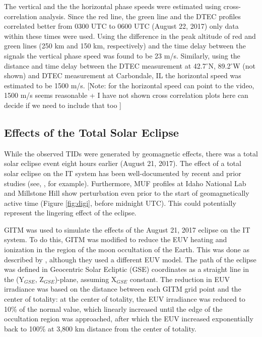  The vertical and the the horizontal phase speeds were estimated using cross-correlation analysis. Since the red line, the green line and the DTEC profiles correlated  better from 0300 UTC to 0600 UTC (August 22, 2017) only data within these times were used. Using the difference in the peak altitude of red and green lines (250 km and 150 km, respectively) and the time delay between the signals the vertical phase speed was found to be 23 m/s. Similarly, using the distance and time delay between the DTEC measurement at 42.7$^\circ$N, 89.2$^\circ$W (not shown) and DTEC measurement at Carbondale, IL the horizontal speed was estimated to be 1500 m/s. [Note: for the horizontal speed can point to the video, 1500 m/s seems reasonable + I have not shown cross correlation plots here can decide if we need to include that too ]
 \subsection{Effects of the Total Solar Eclipse}
While the observed TIDs were generated by geomagnetic effects, there was a total solar eclipse event eight hours earlier (August 21, 2017). The effect of a total solar eclipse on the IT system has been well-documented by recent and prior studies (see, \citet{coster_gnss_2017,mrak_eclipse_2018,liu_1998}, for example). Furthermore, MUF profiles at Idaho National Lab and Millstone Hill show perturbation even prior to the start of geomagnetically active time (Figure \ref{fig:digi}, before midnight UTC). This could potentially represent the lingering effect of the eclipse.  

GITM \citep{ridley_global_2006} was used to simulate the effects of the August 21, 2017 eclipse on the IT system. To do this, GITM was modified to reduce the EUV heating and ionization in the region of the moon occultation of the Earth. This was done as described by \citet{wu_gitm-data_2018}, although they used a different EUV model. The path of the eclipse was defined in Geocentric Solar Ecliptic (GSE) coordinates as a straight line in the (Y$_{GSE}$, Z$_{GSE}$)-plane, assuming X$_{GSE}$ constant. The reduction in EUV irradiance was based on the distance between each GITM grid point and the center of totality: at the center of totality, the EUV irradiance was reduced to 10\% of the normal value, which linearly increased until the edge of the occultation region was approached, after which the EUV increased exponentially back to 100\% at 3,800 km distance from the center of totality.

